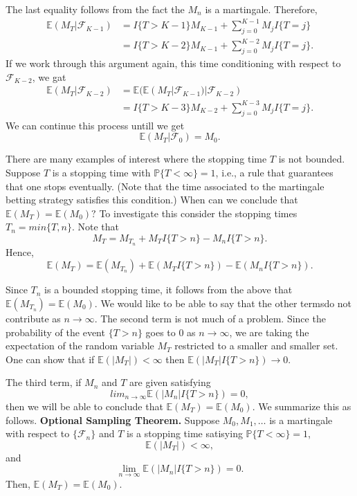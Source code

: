 \documentclass[a4paper,english,12pt]{article}
\begin{document}
The last equality follows from the fact the $M_n$ is a martingale. Therefore,
\begin{align*}
\mathbb{E}(M_T|\mathcal{F}_{K-1}) &=I\{T>K-1\}M_{K-1}+\sum_{j=0}^{K-1}M_jI\{T=j\}\\
								   &=I\{T>K-2\}M_{K-1}+\sum_{j=0}^{K-2}M_jI\{T=j\}.
\end{align*}
If we work through this argument again, this time conditioning with respect to $\mathcal{F}_{K-2}$, we gat
\begin{align*}
\mathbb{E}(M_T|\mathcal{F}_{K-2}) &=\mathbb{E}(\mathbb{E}(M_T|\mathcal{F}_{K-1})|\mathcal{F}_{K-2})\\
								   &=I\{T>K-3\}M_{K-2}+\sum_{j=0}^{K-3}M_jI\{T=j\}.
\end{align*}
We can continue this process untill we get
\begin{equation*}
\mathbb{E}(M_T|\mathcal{F}_0)=M_0.
\end{equation*}

There are many examples of interest where the stopping time $T$ is not bounded. Suppose $T$ is a stopping time with $\mathbb{P}\{T<\infty\}=1$, i.e., a rule that guarantees that one stops eventually. (Note that the time associated to the martingale betting strategy satisfies this condition.) When can we conclude that $\mathbb{E}(M_T)=\mathbb{E}(M_0)?$ To investigate this consider the stopping times $T_n=min\{T,n\}$. Note that
\begin{equation*}
M_T=M_{T_{n}}+M_TI\{T>n\}-M_nI\{T>n\}.
\end{equation*}
Hence,
\begin{equation*}
\mathbb{E}(M_T)=\mathbb{E}(M_{T_{n}})+\mathbb{E}(M_TI\{T>n\})-\mathbb{E}(M_nI\{T>n\}).
\end{equation*}

Since $T_n$ is a bounded stopping time, it follows from the above that $\mathbb{E}(M_{T_{n}})=\mathbb{E}(M_0)$. We would like to be able to say that the other termsdo not contribute as $n\rightarrow \infty$. The second term is not much of a problem.  Since the probability of the event $\{T>n\}$ goes to 0 as $n\rightarrow \infty$, we are taking the expectation of the random variable $M_T$ restricted to a smaller and smaller set. One can show that if $\mathbb{E}(|M_T|)<\infty$ then $\mathbb{E}(|M_T|I\{T>n\}) \rightarrow 0$.

The third term, if $M_n$ and $T$ are given satisfying
\begin{equation*}
lim_{n\rightarrow \infty}\mathbb{E}(|M_n|I\{T>n\})=0,
\end{equation*}
then we will be able to conclude that $\mathbb{E}(M_T)=\mathbb{E}(M_0)$. We summarize this as follows.\newline
\textbf{Optional Sampling Theorem.} Suppose $M_0,M_1,\dots$ is a martingale with respect to $\{\mathcal{F}_n\}$ and $T$ is a stopping time satisying $\mathbb{P}\{T<\infty\}=1$,
\begin{equation*}
\mathbb{E}(|M_T|)<\infty,
\end{equation*}
and
\begin{equation*}
\lim_{n\rightarrow \infty}\mathbb{E}(|M_n|I\{T>n\})=0.
\end{equation*}
Then, $\mathbb{E}(M_T)=\mathbb{E}(M_0)$.
\end{document}
